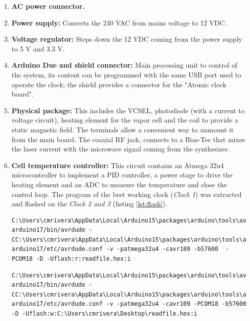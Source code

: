 \documentclass[a4paper,12pt]{article}
\begin{document}
\begin{enumerate}[wide, labelwidth=!, labelindent=0pt]
	\item \textbf{AC power connector.}
	\item \textbf{Power supply: } Converts the 240 VAC from mains voltage to 12 VDC.
	\item \textbf{Voltage regulator: } Steps down the 12 VDC coming from the power supply to 5 V and 3.3 V. 
	\item \textbf{Arduino Due and shield connector: } Main processing unit to control of the system, its content can be programmed with the same USB port used to operate the clock; the shield provides a connector for the "Atomic clock board".
	\item \textbf{Physical package: } This includes the VCSEL, photodiode (with a current to voltage circuit), heating element for the vapor cell and the coil to provide a static magnetic field. The terminals allow a convenient way to unmount it from the main board. The coaxial RF jack, connects to a Bias-Tee that mixes the laser current with the microwave signal coming from the synthesizer.
    \item \textbf{Cell temperature controller: } This circuit contains an Atmega 32u4 microcontroller to implement a PID controller, a power stage to drive the heating element and an ADC to measure the temperature and close the control loop. The program of the best working clock (\textit{Clock 1}) was extracted and flashed on the \textit{Clock 2 and 3} (listing \ref{lst:flash}).
    
    \begin{lstlisting}[style=bash,label={lst:flash},caption={Read operation to extract microcontroller's binary (Windows CMD).}]
C:\Users\cmrivera\AppData\Local\Arduino15\packages\arduino\tools\avrdude\6.3.0-arduino17/bin/avrdude -CC:\Users\cmrivera\AppData\Local\Arduino15\packages\arduino\tools\avrdude\6.3.0-arduino17/etc/avrdude.conf -v -patmega32u4 -cavr109 -b57600  -PCOM18 -D -Uflash:r:readfile.hex:i
    \end{lstlisting}
    
    \begin{lstlisting}[style=bash,label={lst:flash},caption={Write operation to flash microcontroller's binary (Windows CMD).}]
C:\Users\cmrivera\AppData\Local\Arduino15\packages\arduino\tools\avrdude\6.3.0-arduino17/bin/avrdude -CC:\Users\cmrivera\AppData\Local\Arduino15\packages\arduino\tools\avrdude\6.3.0-arduino17/etc/avrdude.conf -v -patmega32u4 -cavr109 -PCOM18 -b57600 -D -Uflash:w:C:\Users\cmrivera\Desktop\readfile.hex:i 
    \end{lstlisting}
    

\end{enumerate}
\end{document}
